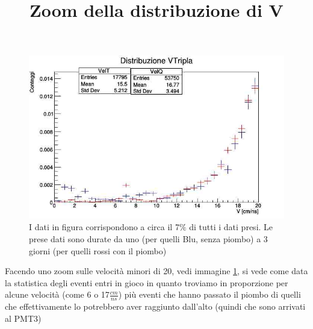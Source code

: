 \documentclass[a4paper]{article}
\begin{document}
\begin{figure}[H]
\centering
\title{Zoom della distribuzione di V}
\begin{center}
\includegraphics[scale=0.3]{./immagini/TimeOFFlight/ZoomVel.jpg}
\caption{I dati in figura corrispondono a circa il 7$\%$ di tutti i dati presi. Le prese dati sono durate da uno (per quelli Blu, senza piombo) a 3 giorni (per quelli rossi con il piombo)}
\label{fig:ZoomV}
\end{center}
\end{figure}

Facendo uno zoom sulle velocità minori di 20, vedi immagine \ref{fig:ZoomV}, si vede come data la statistica degli eventi entri in gioco in quanto troviamo in proporzione per alcune velocità (come 6 o 17$\frac{cm}{ns}$) più eventi che hanno passato il piombo di quelli che effettivamente lo potrebbero aver raggiunto dall'alto (quindi che sono arrivati al PMT3)
\end{document}
